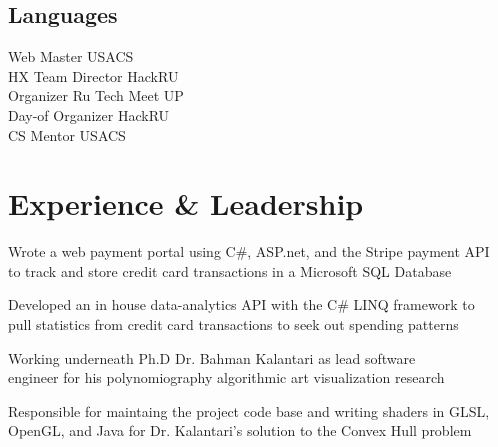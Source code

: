 \documentclass[]{deedy-resume-openfont}
\begin{document}
\begin{minipage}[t]{0.33\textwidth}
\subsection{Languages}
Web Master \textbullet{} USACS \\ 
HX Team Director \textbullet{} HackRU \\
Organizer \textbullet{} Ru Tech Meet UP \\ 
Day-of Organizer \textbullet{} HackRU \\
CS Mentor \textbullet{} USACS \\ 
\sectionsep


%
%

\end{minipage} 
\hfill
\begin{minipage}[t]{0.66\textwidth} 


\section{Experience \& Leadership}

\vspace{\topsep} 
\begin{tightemize}
\item Wrote a web payment portal using C\#, ASP.net, and the Stripe payment API \\to track and store credit card transactions in a Microsoft SQL Database
\item Developed an in house data-analytics API with the C\# LINQ framework to \\pull statistics from credit card transactions to seek out spending patterns
\end{tightemize}
\sectionsep

\begin{tightemize}
\item Working underneath Ph.D Dr. Bahman Kalantari as lead software \\engineer for his polynomiography algorithmic art visualization research 
\item Responsible for maintaing the project code base and writing shaders in GLSL, OpenGL, and Java for Dr. Kalantari's solution to the Convex Hull problem
\end{tightemize}
\sectionsep


\end{minipage}
\end{document}
